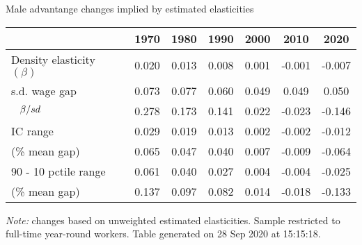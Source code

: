\begin{center}
\begin{threeparttable}[!h]
\caption{Male advantange changes implied by estimated elasticities}
\label{tab:IC}
\begin{tabular}{lcccccc}
\toprule
\toprule
\textbf{}&\multicolumn{1}{c}{\textbf{1970}}&\multicolumn{1}{c}{\textbf{1980}}&\multicolumn{1}{c}{\textbf{1990}}&\multicolumn{1}{c}{\textbf{2000}}&\multicolumn{1}{c}{\textbf{2010}}&\multicolumn{1}{c}{\textbf{2020}} \\
\midrule
Density elasticity $ (\beta ) $&       0.020         &       0.013         &       0.008         &       0.001         &      -0.001         &      -0.007         \\
 \hspace{3mm} s.d. wage gap &       0.073         &       0.077         &       0.060         &       0.049         &       0.049         &       0.050         \\
$ \hspace{3mm}\beta / sd $&       0.278         &       0.173         &       0.141         &       0.022         &      -0.023         &      -0.146         \\
\midrule IC range   &       0.029         &       0.019         &       0.013         &       0.002         &      -0.002         &      -0.012         \\
\hspace{3mm} (\% mean gap) &       0.065         &       0.047         &       0.040         &       0.007         &      -0.009         &      -0.064         \\
 \midrule 90 - 10 pctile range  &       0.061         &       0.040         &       0.027         &       0.004         &      -0.004         &      -0.025         \\
\hspace{3mm} (\% mean gap)&       0.137         &       0.097         &       0.082         &       0.014         &      -0.018         &      -0.133         \\
\bottomrule
\bottomrule
\end{tabular}
\begin{tablenotes}
\item \footnotesize \textit{Note:} changes based on unweighted estimated elasticities. Sample restricted to full-time year-round workers. Table generated on 28 Sep 2020 at 15:15:18.
\end{tablenotes}
\end{threeparttable}
\end{center}
